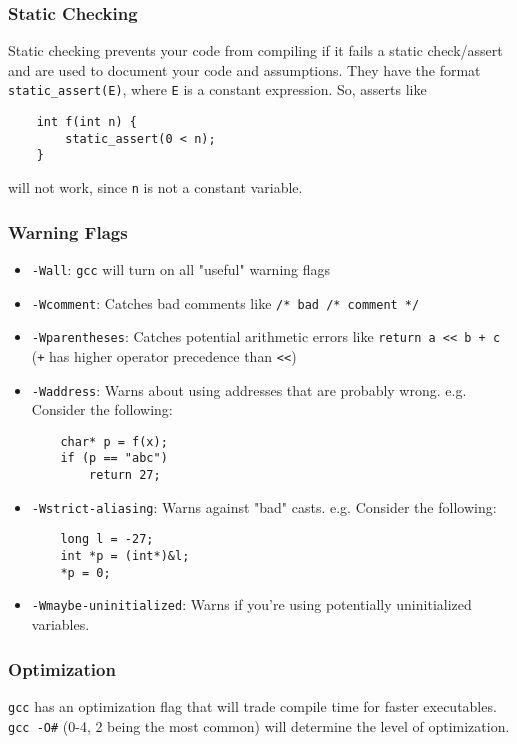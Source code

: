 \documentclass[13pt]{article}
\begin{document}
\subsubsection{Static Checking}
Static checking prevents your code from compiling if it fails a static check/assert and are used to document your code and assumptions. They have the format \\
\texttt{static\_assert(E)}, where \texttt{E} is a constant expression. So, asserts like
\begin{verbatim}
    int f(int n) {
        static_assert(0 < n);
    }
\end{verbatim}
will not work, since \texttt{n} is not a constant variable.

\subsubsection{Warning Flags}

\begin{itemize}[label=]
\item \texttt{-Wall}: \texttt{gcc} will turn on all "useful" warning flags
\item \texttt{-Wcomment}: Catches bad comments like \texttt{/* bad /* comment */}
\item \texttt{-Wparentheses}: Catches potential arithmetic errors like \texttt{return a << b + c} (\texttt{+} has higher operator precedence than \texttt{<<})
\item \texttt{-Waddress}: Warns about using addresses that are probably wrong. e.g. Consider the following:
\begin{verbatim}
    char* p = f(x);
    if (p == "abc")
        return 27;
\end{verbatim}

\item \texttt{-Wstrict-aliasing}: Warns against "bad" casts. e.g. Consider the following:
\begin{verbatim}
    long l = -27;
    int *p = (int*)&l;
    *p = 0;
\end{verbatim}
\item \texttt{-Wmaybe-uninitialized}: Warns if you're using potentially uninitialized variables.
\end{itemize}

\subsubsection{Optimization}
\texttt{gcc} has an optimization flag that will trade compile time for faster executables. \\
\texttt{gcc -O\#} (0-4, 2 being the most common) will determine the level of optimization.
\end{document}
